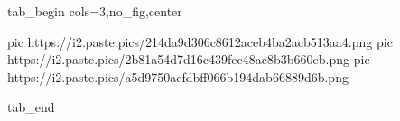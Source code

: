  
 
 
 
 


\ifcmt
  tab_begin cols=3,no_fig,center

     pic https://i2.paste.pics/214da9d306c8612aceb4ba2acb513aa4.png
		 pic https://i2.paste.pics/2b81a54d7d16c439fcc48ac8b3b660eb.png
		 pic https://i2.paste.pics/a5d9750acfdbff066b194dab66889d6b.png

  tab_end
\fi
